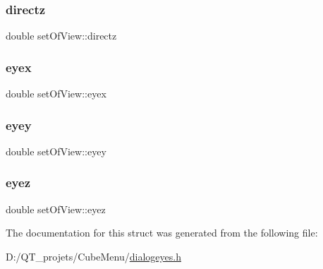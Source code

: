 \hypertarget{structset_of_view_a6c47319cf5b1aadaacb5fbbcdc4ab280}{}\label{structset_of_view_a6c47319cf5b1aadaacb5fbbcdc4ab280} 
\subsubsection{\texorpdfstring{directz}{directz}}
{\footnotesize\ttfamily double set\+Of\+View\+::directz}

\hypertarget{structset_of_view_a0bb9d7f541ae499a85494ccb697e48fc}{}\label{structset_of_view_a0bb9d7f541ae499a85494ccb697e48fc} 
\subsubsection{\texorpdfstring{eyex}{eyex}}
{\footnotesize\ttfamily double set\+Of\+View\+::eyex}

\hypertarget{structset_of_view_af7c9b4ac6d7a4098d3b4639b2763376e}{}\label{structset_of_view_af7c9b4ac6d7a4098d3b4639b2763376e} 
\subsubsection{\texorpdfstring{eyey}{eyey}}
{\footnotesize\ttfamily double set\+Of\+View\+::eyey}

\hypertarget{structset_of_view_ae8bf003e65ba68562d248ade07168b8e}{}\label{structset_of_view_ae8bf003e65ba68562d248ade07168b8e} 
\subsubsection{\texorpdfstring{eyez}{eyez}}
{\footnotesize\ttfamily double set\+Of\+View\+::eyez}



The documentation for this struct was generated from the following file\+:\begin{DoxyCompactItemize}
\item 
D\+:/\+Q\+T\+\_\+projets/\+Cube\+Menu/\hyperlink{dialogeyes_8h}{dialogeyes.\+h}\end{DoxyCompactItemize}
